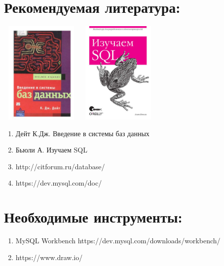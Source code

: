\documentclass[12pt,a4paper]{article}
\begin{document}
\section{Рекомендуемая литература:}
\includegraphics[width=4cm,height=5cm]{images/Overview/recommended_literature_book_01.jpg}
\includegraphics[width=4cm,height=5cm]{images/Overview/recommended_literature_book_02.jpg}
\begin{enumerate}
    \item Дейт К.Дж. Введение в системы баз данных
    \item Бьюли А. Изучаем SQL
    \item http://citforum.ru/database/
    \item https://dev.mysql.com/doc/
\end{enumerate}
\section{Необходимые инструменты:}
\begin{enumerate}
    \item MySQL Workbench https://dev.mysql.com/downloads/workbench/
    \item https://www.draw.io/
\end{enumerate}
\end{document}
